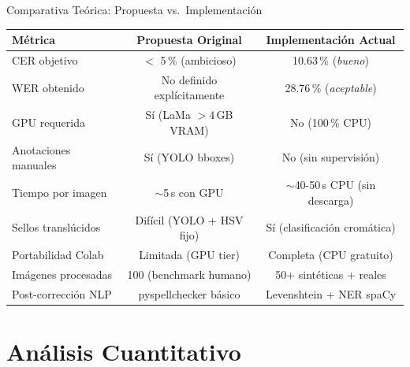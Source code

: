 \documentclass[aspectratio=169, 11pt]{beamer}
\newcommand{\rojo}[1]{\textcolor{PriRed}{#1}}
\newcommand{\verde}[1]{\textcolor{AccGreen}{#1}}
\newcommand{\amber}[1]{\textcolor{AccAmber}{#1}}
\newcommand{\mejora}[1]{\verde{\textbf{#1}}}
\newcommand{\original}[1]{\textcolor{OldRed}{\textbf{#1}}}
\begin{document}
\begin{frame}{Comparativa Teórica: Propuesta vs.\ Implementación}
  \centering
  \footnotesize
  \begin{tabular}{@{}p{3.2cm}cc@{}}
    \toprule
    \textbf{Métrica}
      & \original{Propuesta Original}
      & \mejora{Implementación Actual} \\
    \midrule
    \rowcolor{RowA}
    CER objetivo
      & $<$ 5\,\% (ambicioso)
      & \verde{10.63\,\%} (\textit{bueno}) \\[3pt]
    \rowcolor{RowB}
    WER obtenido
      & No definido explícitamente
      & \amber{28.76\,\%} (\textit{aceptable}) \\[3pt]
    \rowcolor{RowA}
    GPU requerida
      & \rojo{Sí} (LaMa $>4$\,GB VRAM)
      & \verde{No} (100\,\% CPU) \\[3pt]
    \rowcolor{RowB}
    Anotaciones manuales
      & \rojo{Sí} (YOLO bboxes)
      & \verde{No} (sin supervisión) \\[3pt]
    \rowcolor{RowA}
    Tiempo por imagen
      & $\sim$5\,s con GPU
      & $\sim$40-50\,s CPU (sin descarga) \\[3pt]
    \rowcolor{RowB}
    Sellos translúcidos
      & \rojo{Difícil} (YOLO + HSV fijo)
      & \verde{Sí} (clasificación cromática) \\[3pt]
    \rowcolor{RowA}
    Portabilidad Colab
      & \rojo{Limitada} (GPU tier)
      & \verde{Completa} (CPU gratuito) \\[3pt]
    \rowcolor{RowB}
    Imágenes procesadas
      & 100 (benchmark humano)
      & \verde{50+ sintéticas + reales} \\[3pt]
    \rowcolor{RowA}
    Post-corrección NLP
      & pyspellchecker básico
      & \verde{Levenshtein + NER spaCy} \\
    \bottomrule
  \end{tabular}
\end{frame}

\section{Análisis Cuantitativo}
\end{document}
